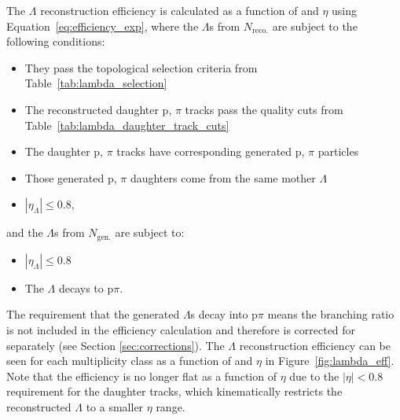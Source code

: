  The $\Lambda$ reconstruction efficiency is calculated as a function of \pt and $\eta$ using Equation~\ref{eq:efficiency_exp}, where the $\Lambda$s from $N_{\text{reco.}}$ are subject to the following conditions:
%
\begin{itemize}
	\item They pass the topological selection criteria from Table~\ref{tab:lambda_selection}
	\item The reconstructed daughter p, $\pi$ tracks pass the quality cuts from Table~\ref{tab:lambda_daughter_track_cuts}
	\item The daughter p, $\pi$ tracks have corresponding generated p, $\pi$ particles
	\item Those generated p, $\pi$ daughters come from the same mother $\Lambda$
	\item $|\eta_{\Lambda}| \leq 0.8$,
\end{itemize}
%
and the $\Lambda$s from $N_{\text{gen.}}$ are subject to:
%
\begin{itemize}
	\item $|\eta_{\Lambda}| \leq 0.8$
	\item The $\Lambda$ decays to p$\pi$.
\end{itemize}
%
The requirement that the generated $\Lambda$s decay into p$\pi$ means the branching ratio is not included in the efficiency calculation and therefore is corrected for separately (see Section \ref{sec:corrections}). The $\Lambda$ reconstruction efficiency can be seen for each multiplicity class as a function of \pt and $\eta$ in Figure~\ref{fig:lambda_eff}. Note that the efficiency is no longer flat as a function of $\eta$ due to the $|\eta| < 0.8$ requirement for the daughter tracks, which kinematically restricts the reconstructed $\Lambda$ to a smaller $\eta$ range.

